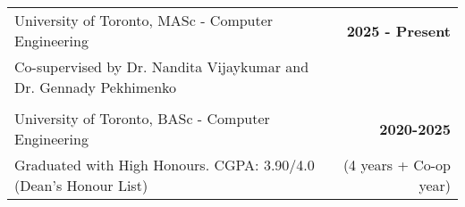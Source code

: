 \begin{tabularx}{\textwidth}{ @{}X r@{} }
    University of Toronto, MASc - Computer Engineering & \textbf{2025 - Present} \\
    Co-supervised by Dr. Nandita Vijaykumar and Dr. Gennady Pekhimenko \\[-3pt]
    & \\
    University of Toronto, BASc - Computer Engineering & \textbf{2020-2025} \\
    Graduated with High Honours. CGPA: 3.90/4.0 (Dean’s Honour List) & (4 years + Co-op year) \\
\end{tabularx}
